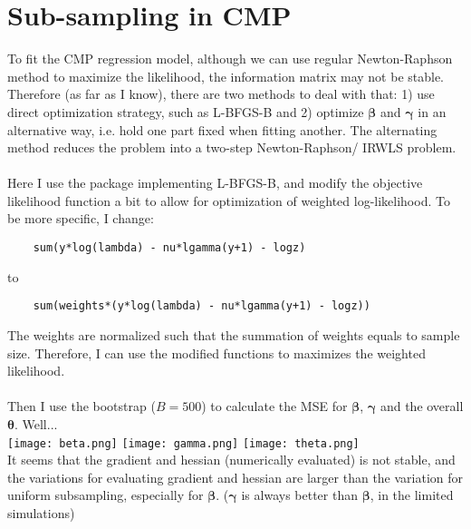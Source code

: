 \documentclass[]{article}
\begin{document}
\section{Sub-sampling in CMP}
To fit the CMP regression model, although we can use regular Newton-Raphson method to maximize the likelihood, the information matrix may not be stable. Therefore (as far as I know), there are two methods to deal with that: 1) use direct optimization strategy, such as L-BFGS-B and 2) optimize $\boldsymbol{\beta}$ and $\boldsymbol{\gamma}$ in an alternative way, i.e. hold one part fixed when fitting another. The alternating method reduces the problem into a two-step Newton-Raphson/ IRWLS problem.\\
\\
Here I use the package implementing L-BFGS-B, and modify the objective likelihood function a bit to allow for optimization of weighted log-likelihood. To be more specific, I change:
\begin{lstlisting}
	sum(y*log(lambda) - nu*lgamma(y+1) - logz)
\end{lstlisting} 
to
\begin{lstlisting}
	sum(weights*(y*log(lambda) - nu*lgamma(y+1) - logz))
\end{lstlisting} 
The weights are normalized such that the summation of weights equals to sample size. Therefore, I can use the modified functions to maximizes the weighted likelihood.\\
\\
Then I use the bootstrap ($B = 500$) to calculate the MSE for $\boldsymbol{\beta}$, $\boldsymbol{\gamma}$ and the overall $\boldsymbol{\theta}$. Well...\\
\texttt{[image: beta.png]}
\texttt{[image: gamma.png]}
\texttt{[image: theta.png]}
\\
It seems that the gradient and hessian (numerically evaluated) is not stable, and the variations for evaluating gradient and hessian are larger than the variation for uniform subsampling, especially for $\boldsymbol{\beta}$. ($\boldsymbol{\gamma}$ is always better than $\boldsymbol{\beta}$, in the limited simulations) 
















 












	
	
	
	
	
	
\end{document}
